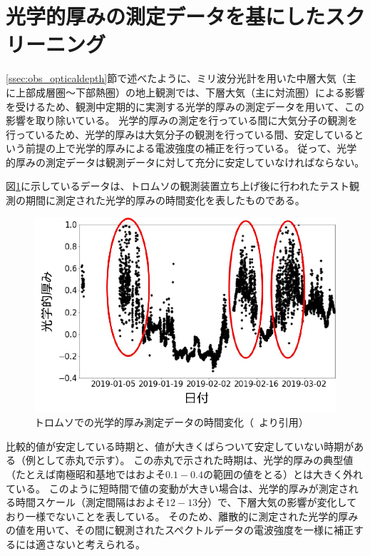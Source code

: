 \section{光学的厚みの測定データを基にしたスクリーニング}
\label{sec:screening_opticaldepth}
\ref{ssec:obs_opticaldepth}節で述べたように、ミリ波分光計を用いた中層大気（主に上部成層圏〜下部熱圏）の地上観測では、下層大気（主に対流圏）による影響を受けるため、観測中定期的に実測する光学的厚みの測定データを用いて、この影響を取り除いている。
光学的厚みの測定を行っている間に大気分子の観測を行っているため、光学的厚みは大気分子の観測を行っている間、安定しているという前提の上で光学的厚みによる電波強度の補正を行っている。
従って、光学的厚みの測定データは観測データに対して充分に安定していなければならない。\par

図\ref{fig:optical_depth_tromsoe}に示しているデータは、トロムソの観測装置立ち上げ後に行われたテスト観測の期間に測定された光学的厚みの時間変化を表したものである。
\begin{figure}[htbp]
    \centering
    \includegraphics[width=\linewidth]{master_thesis_contents/master_thesis_fig/optical_depth_tromsoe.pdf}
    \caption{トロムソでの光学的厚み測定データの時間変化（~\cite{goto2021bachelor}より引用）}
    \label{fig:optical_depth_tromsoe}
\end{figure}
比較的値が安定している時期と、値が大きくばらついて安定していない時期がある（例として赤丸で示す）。
この赤丸で示された時期は、光学的厚みの典型値（たとえば南極昭和基地ではおよそ$0.1-0.4$の範囲の値をとる）とは大きく外れている。
このように短時間で値の変動が大きい場合は、光学的厚みが測定される時間スケール（測定間隔はおよそ$12-13$分）で、下層大気の影響が変化しており一様でないことを表している。
そのため、離散的に測定された光学的厚みの値を用いて、その間に観測されたスペクトルデータの電波強度を一様に補正するには適さないと考えられる。\par

